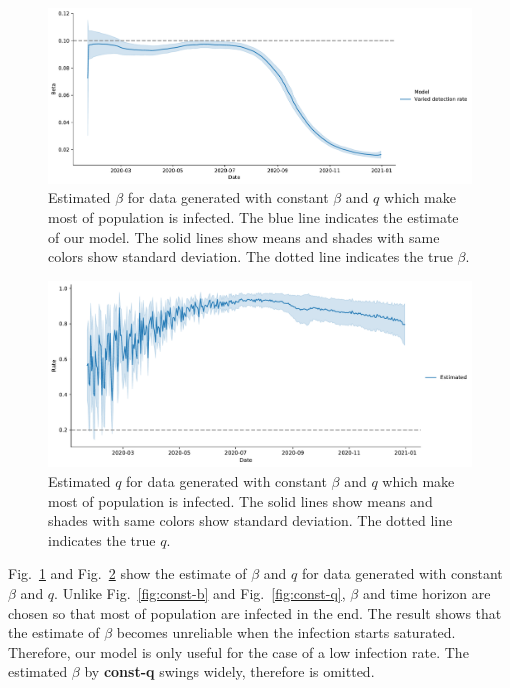 \documentclass{amsart}
\begin{document}
\begin{figure}[h]
 \centering
 \includegraphics[width=\linewidth]{fig/saturate_beta.pdf}
 \caption{Estimated $\beta$ for data generated with constant $\beta$ and $q$ which make most of population is infected. The blue line indicates the estimate of our model. The solid lines show means and shades with same colors show standard deviation. The dotted line indicates the true $\beta$.}
 \label{fig:saturate-b}
\end{figure}

\begin{figure}[h]
 \centering
 \includegraphics[width=\linewidth]{fig/saturate_q.pdf}
 \caption{Estimated $q$ for data generated with constant $\beta$ and $q$ which make most of population is infected. The solid lines show means and shades with same colors show standard deviation. The dotted line indicates the true $q$.}
 \label{fig:saturate-q}
\end{figure}

Fig.~\ref{fig:saturate-b} and Fig.~\ref{fig:saturate-q} show the estimate of $\beta$ and $q$ for data generated with constant $\beta$ and $q$.
Unlike Fig.~\ref{fig:const-b} and Fig.~\ref{fig:const-q}, $\beta$ and time horizon are chosen so that most of population are infected in the end.
The result shows that the estimate of $\beta$ becomes unreliable when the infection starts saturated.
Therefore, our model is only useful for the case of a low infection rate.
The estimated $\beta$ by \textbf{const-q} swings widely, therefore is omitted.
\end{document}
